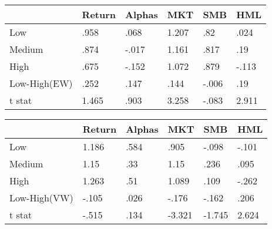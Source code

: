 \begin{table}[htbp]
\begin{tabular}{|l|l|l|l|l|l|}\hline  
 & Return  & Alphas  & MKT  & SMB  & HML  \\ \hline  
Low & .958 & .068 & 1.207 & .82 & .024 \\ \hline 
Medium & .874 & -.017 & 1.161 & .817 & .19 \\ \hline 
High & .675 & -.152 & 1.072 & .879 & -.113 \\ \hline 
Low-High(EW) & .252 & .147 & .144 & -.006 & .19 \\ \hline 
t stat & 1.465 & .903 & 3.258 & -.083 & 2.911 \\ \hline 
  \end{tabular}
\end{table}
\begin{table}[htbp]
\begin{tabular}{|l|l|l|l|l|l|}\hline  
 & Return  & Alphas  & MKT  & SMB  & HML  \\ \hline  
Low & 1.186 & .584 & .905 & -.098 & -.101 \\ \hline 
Medium & 1.15 & .33 & 1.15 & .236 & .095 \\ \hline 
High & 1.263 & .51 & 1.089 & .109 & -.262 \\ \hline 
Low-High(VW) & -.105 & .026 & -.176 & -.162 & .206 \\ \hline 
t stat & -.515 & .134 & -3.321 & -1.745 & 2.624 \\ \hline 
  \end{tabular}
\end{table}
